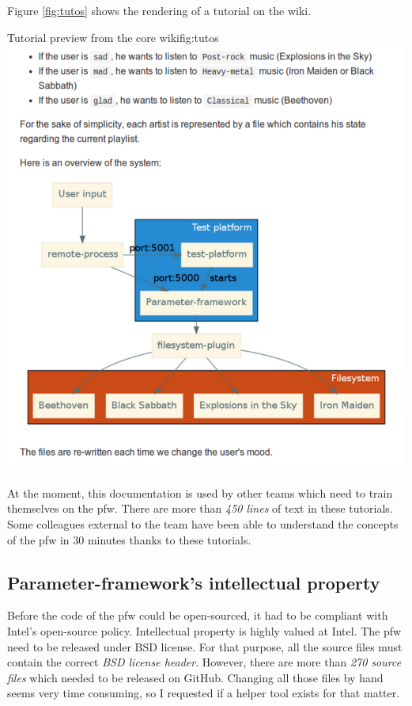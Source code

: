 Figure \ref{fig:tutos} shows the rendering of a tutorial on the wiki.
\begin{figureGraphics}{Tutorial preview from the core wiki}{fig:tutos}
    \includegraphics[height=0.5\textheight]{./src/img/tutos.pdf}
\end{figureGraphics}

At the moment, this documentation is used by other teams which need to train themselves on the \gls{pfw}.
There are more than \emph{450 lines} of text in these tutorials.
Some colleagues external to the team have been able to understand the concepts of the \gls{pfw} in 30 minutes
thanks to these tutorials.


\subsection{Parameter-framework's intellectual property}
Before the code of the \gls{pfw} could be open-sourced, it had to be compliant with Intel's open-source policy.
Intellectual property is highly valued at Intel. The \gls{pfw} need to be released under
BSD license.
For that purpose, all the source files must contain the correct \emph{BSD license header}.
However, there are more than \emph{270 source files} which needed to be released on \gls{GitHub}.
Changing all those files by hand seems very time consuming, so I requested if a helper tool exists for that matter.

